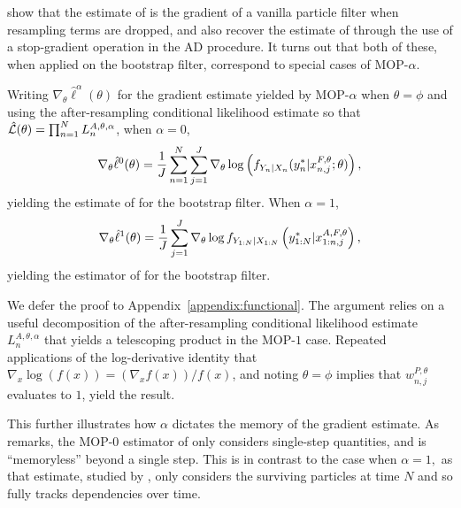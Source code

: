 \documentclass[11pt]{article}
\newcommand\arxiv[2]{#1} %
\begin{document}
\cite{scibior21} show that the estimate of \cite{naesseth18} is the gradient of a vanilla particle filter when resampling terms are dropped, and also recover the estimate of \cite{poyiadjis11} through the use of a stop-gradient operation in the AD procedure. It turns out that both of these, when applied on the bootstrap filter, correspond to special cases of MOP-$\alpha$.


\begin{thm}
    \label{thm:mop-functional-forms}
    Writing $\nabla_\theta \hat\ell^\alpha(\theta)$ for the gradient estimate yielded by MOP-$\alpha$ when $\theta=\phi$ and using the after-resampling conditional likelihood estimate so that $\hat{\mathcal{L}}(\theta) = \prod_{n=1}^N L_n^{A, \theta, \alpha}$, when $\alpha=0$,
    \vspace*{-2.5mm}
    \begin{equation} \nonumber
        \nabla_\theta \hat\ell^0(\theta) 
        = \frac{1}{J} \sum_{n=1}^N \sum_{j=1}^J \nabla_\theta \log\left(f_{Y_n|X_{n}}(y_n^*|x_{n,j}^{F, \theta}; \theta)\right),
        \vspace*{-2.5mm}
    \end{equation}
    yielding the estimate of \cite{naesseth18} for the bootstrap filter. When $\alpha=1$,
    \vspace*{-2.5mm}
    \begin{equation} \nonumber
        \nabla_\theta \hat{\ell}^1(\theta) 
        = \frac{1}{J}\sum_{j=1}^J \nabla_\theta \log f_{Y_{1:N}|X_{1:N}}\left(y_{1:N}^* | x_{1:n,j}^{A, F,\theta}\right),
    \vspace*{-2.5mm}
    \end{equation}
    yielding the estimator of \cite{poyiadjis11, scibior21} for the bootstrap filter.
\end{thm}

We defer the proof to \arxiv{Appendix~\ref{appendix:functional}}{the supplementary material}. 
The argument relies on a useful decomposition of the after-resampling conditional likelihood estimate $L_n^{A,\theta,\alpha}$ that yields a telescoping product in the MOP-$1$ case. 
Repeated applications of the log-derivative identity that $\nabla_x \log(f(x)) = (\nabla_x f(x))/f(x)$, and noting $\theta=\phi$ implies that $w_{n,j}^{P,\theta}$ evaluates to $1$, yield the result. 

This further illustrates how $\alpha$ dictates the memory of the gradient estimate. 
As \cite{scibior21} remarks, the MOP-$0$ estimator of \cite{naesseth18} only considers single-step quantities, and is ``memoryless'' beyond a single step. 
This is in contrast to the case when $\alpha=1,$ as that estimate, studied by \cite{poyiadjis11}, only considers the surviving particles at time $N$ and so fully tracks dependencies over time. 
\end{document}
